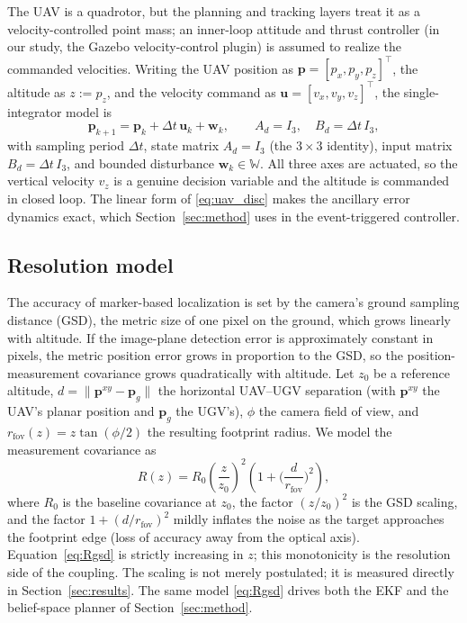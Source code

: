 \documentclass{ifacconf}
\begin{document}
The UAV is a quadrotor, but the planning and tracking layers treat it as a velocity-controlled point
mass; an inner-loop attitude and thrust controller (in our study, the Gazebo velocity-control plugin)
is assumed to realize the commanded velocities. Writing the UAV position as
$\mathbf{p}=[p_x,p_y,p_z]^{\!\top}$, the altitude as $z:=p_z$, and the velocity command as
$\mathbf{u}=[v_x,v_y,v_z]^{\!\top}$, the single-integrator model is
\begin{equation}
\mathbf{p}_{k+1}=\mathbf{p}_k+\Delta t\,\mathbf{u}_k+\mathbf{w}_k,\qquad A_d=I_3,\quad B_d=\Delta t\,I_3,
\label{eq:uav_disc}
\end{equation}
with sampling period $\Delta t$, state matrix $A_d=I_3$ (the $3\times3$ identity), input matrix
$B_d=\Delta t\,I_3$, and bounded disturbance $\mathbf{w}_k\in\mathbb{W}$. All three axes are actuated,
so the vertical velocity $v_z$ is a genuine decision variable and the altitude is commanded in closed
loop. The linear form of \eqref{eq:uav_disc} makes the ancillary error dynamics exact, which
Section~\ref{sec:method} uses in the event-triggered controller.

\subsection{Resolution model}
\label{sec:resolution}
The accuracy of marker-based localization is set by the camera's ground sampling distance (GSD), the
metric size of one pixel on the ground, which grows linearly with altitude. If the image-plane
detection error is approximately constant in pixels, the metric position error grows in proportion to
the GSD, so the position-measurement covariance grows quadratically with altitude. Let $z_0$ be a
reference altitude, $d=\lVert\mathbf{p}^{xy}-\mathbf{p}_g\rVert$ the horizontal UAV--UGV separation
(with $\mathbf{p}^{xy}$ the UAV's planar position and $\mathbf{p}_g$ the UGV's), $\phi$ the camera
field of view, and $r_{\mathrm{fov}}(z)=z\tan(\phi/2)$ the resulting footprint radius. We model the
measurement covariance as
\begin{equation}
R(z)=R_0\!\left(\frac{z}{z_0}\right)^{\!2}\!\left(1+\Big(\frac{d}{r_{\mathrm{fov}}}\Big)^{\!2}\right),
\label{eq:Rgsd}
\end{equation}
where $R_0$ is the baseline covariance at $z_0$, the factor $(z/z_0)^2$ is the GSD scaling, and the
factor $1+(d/r_{\mathrm{fov}})^2$ mildly inflates the noise as the target approaches the footprint
edge (loss of accuracy away from the optical axis). Equation~\eqref{eq:Rgsd} is strictly increasing
in $z$; this monotonicity is the resolution side of the coupling. The scaling is not merely
postulated; it is measured directly in Section~\ref{sec:results}. The same model \eqref{eq:Rgsd}
drives both the EKF and the belief-space planner of Section~\ref{sec:method}.
\end{document}
